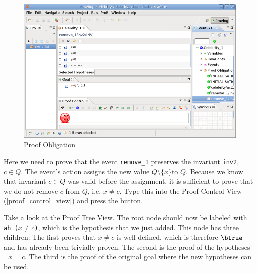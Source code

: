 \begin{figure}[!ht]
\begin{center}
	\includegraphics{img/tutorial/tut_08_proof2.png}
	\caption{Proof Obligation}
	\label{fig_tut_08_proof_obligation}
\end{center}
\end{figure}


Here we need to prove that the event \texttt{remove\_1} preserves the invariant \texttt{inv2},
  $c\in Q$.
The event's action assigns the new value $Q\setminus \{x\} $to $Q$.
Because we know that invariant $c\in Q$ was valid before the assignment, 
 it is sufficient to prove that we do not remove $c$ from $Q$, i.e. \textsf{$x \neq c$}. Type this into the \textsf{Proof Control View} (\ref{proof_control_view}) and press the \textsf{ button}. 


Take a look at the Proof Tree View. The root node should now be labeled with \texttt{ah ($x\neq c$)},
  which is the hypothesis that we just added.
This node has three children: The first proves that $x\neq c$ is well-defined, which is therefore $\btrue$ and has already been trivially proven.
The second is the proof of the hypotheses $\lnot x=c$.
The third is the proof of the original goal where the new hypotheses can be used.

